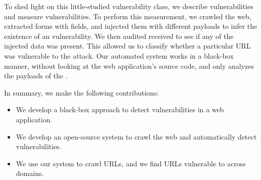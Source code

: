 To shed light on this little-studied vulnerability class, we describe
\ehi vulnerabilities and measure \ehi vulnerabilities. To perform this
measurement, we crawled the web, extracted forms with \email fields,
and injected them with different payloads to infer the existence of an
\ehi vulnerability. We then audited received \emails to see if any of
the injected data was present. This allowed us to classify whether a
particular URL was vulnerable to the attack. Our automated system
works in a black-box manner, without looking at the web application's
source code, and only analyzes the payloads of the \emails.

In summary, we make the following contributions:
\begin{itemize}

\item We develop a black-box approach to detect \ehi vulnerabilities in a web application.
\vspace{-2ex}
\item We develop an open-source system to crawl the web and automatically detect \ehi vulnerabilities.
\vspace{-2ex}
\item We use our system to crawl \urls URLs, and we find \success URLs vulnerable to \ehi across \domains domains. 
\vspace{-2ex}
\end{itemize}
